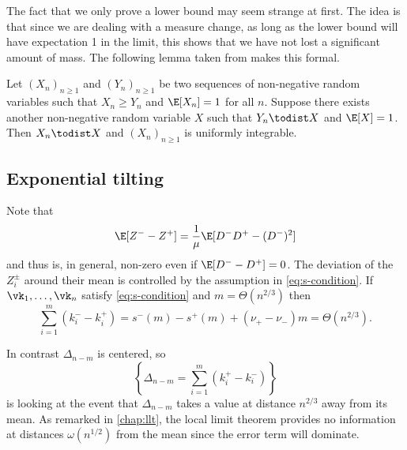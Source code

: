 The fact that we only prove a lower bound may seem strange at first. The idea is that since we are dealing with a measure change, as long as the lower bound will have expectation 1 in the limit, this shows that we have not lost a significant amount of mass. The following lemma taken from \cite[Lemma 4.8]{conchon--kerjanStableGraphMetric2020} makes this formal.
\begin{lemma}
    \label{lem:lower-bound-suff}
    Let $(X_n)_{n \geq 1}$ and $(Y_n)_{n \geq 1}$ be two sequences of non-negative random variables such that $X_n \geq Y_n$ and $\E[X_n] = 1$ for all $n$. Suppose there exists another non-negative random variable $X$ such that $Y_n \todist X$ and $\E[X] = 1$. Then $X_n \todist X$ and $(X_n)_{n \geq 1}$ is uniformly integrable.
\end{lemma}

\subsection{Exponential tilting}

Note that
\begin{equation*}
    \E[Z^- - Z^+] = \frac{1}{\mu} \E[D^-D^+ - (D^-)^2]
\end{equation*}
and thus is, in general, non-zero even if $\E[D^- - D^+] = 0$. The deviation of the $Z^{\pm}_i$ around their mean is controlled by the assumption in \cref{eq:s-condition}. If $\vk_1, \ldots, \vk_n$ satisfy \cref{eq:s-condition} and $m = \Theta(n^{2/3})$ then
\begin{equation*}
    \sum_{i=1}^m (k_i^- - k_i^+) = s^-(m) - s^+(m) + (\nu_+ - \nu_-) m = \Theta(n^{2/3}).
\end{equation*}

In contrast $\Delta_{n-m}$ is centered, so
\begin{equation*}
    \left\{ \Delta_{n-m} = \textstyle \sum_{i=1}^m (k_i^+ - k_i^-) \right\}  
\end{equation*}
is looking at the event that $\Delta_{n-m}$ takes a value at distance $n^{2/3}$ away from its mean. As remarked in \cref{chap:llt}, the local limit theorem provides no information at distances $\omega(n^{1/2})$ from the mean since the error term will dominate.

